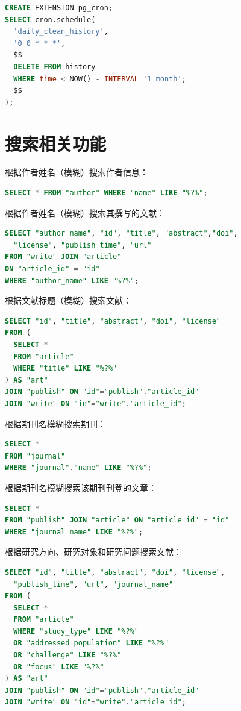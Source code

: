 \documentclass[UTF8,openany]{ctexbook}
\begin{document}
\begin{lstlisting}[language=sql]
CREATE EXTENSION pg_cron;
SELECT cron.schedule(
  'daily_clean_history',  
  '0 0 * * *',
  $$
  DELETE FROM history
  WHERE time < NOW() - INTERVAL '1 month';
  $$
);
\end{lstlisting}


\section{搜索相关功能}

根据作者姓名（模糊）搜索作者信息：

\begin{lstlisting}[language=sql]
SELECT * FROM "author" WHERE "name" LIKE "%?%";
\end{lstlisting}

根据作者姓名（模糊）搜索其撰写的文献：

\begin{lstlisting}[language=sql]
SELECT "author_name", "id", "title", "abstract","doi",
  "license", "publish_time", "url" 
FROM "write" JOIN "article" 
ON "article_id" = "id" 
WHERE "author_name" LIKE "%?%";
\end{lstlisting}

根据文献标题（模糊）搜索文献：

\begin{lstlisting}[language=sql]
SELECT "id", "title", "abstract", "doi", "license"
FROM (
  SELECT * 
  FROM "article"
  WHERE "title" LIKE "%?%"
) AS "art"
JOIN "publish" ON "id"="publish"."article_id"
JOIN "write" ON "id"="write"."article_id";
\end{lstlisting}

根据期刊名模糊搜索期刊：

\begin{lstlisting}[language=sql]
SELECT * 
FROM "journal" 
WHERE "journal"."name" LIKE "%?%";
\end{lstlisting}

根据期刊名模糊搜索该期刊刊登的文章：
\begin{lstlisting}[language=sql]
SELECT * 
FROM "publish" JOIN "article" ON "article_id" = "id"
WHERE "journal_name" LIKE "%?%";
\end{lstlisting}

根据研究方向、研究对象和研究问题搜索文献：
\begin{lstlisting}[language=sql]
SELECT "id", "title", "abstract", "doi", "license", 
  "publish_time", "url", "journal_name"
FROM (
  SELECT * 
  FROM "article"
  WHERE "study_type" LIKE "%?%"
  OR "addressed_population" LIKE "%?%"
  OR "challenge" LIKE "%?%"
  OR "focus" LIKE "%?%"
) AS "art"
JOIN "publish" ON "id"="publish"."article_id"
JOIN "write" ON "id"="write"."article_id";
\end{lstlisting}
\end{document}
